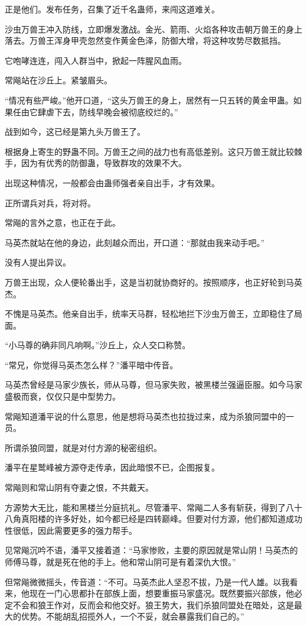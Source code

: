 \begin{this_body}
正是他们。发布任务，召集了近千名蛊师，来闯这道难关。

沙虫万兽王冲入防线，立即爆发激战。金光、箭雨、火焰各种攻击朝万兽王的身上落去。万兽王浑身甲壳忽然变作黄金色泽，防御大增，将这种攻势尽数抵挡。

它咆哮连连，闯入人群当中，掀起一阵腥风血雨。

常飚站在沙丘上。紧皱眉头。

“情况有些严峻。”他开口道，“这头万兽王的身上，居然有一只五转的黄金甲蛊。如果任由它肆虐下去，防线早晚会被彻底绞烂的。”

战到如今，这已经是第九头万兽王了。

根据身上寄生的野蛊不同。万兽王之间的战力也有高低差别。这只万兽王就比较棘手，因为有优秀的防御蛊，导致群攻的效果不大。

出现这种情况，一般都会由蛊师强者亲自出手，才有效果。

正所谓兵对兵，将对将。

常飚的言外之意，也正在于此。

马英杰就站在他的身边，此刻越众而出，开口道：“那就由我来动手吧。”

没有人提出异议。

万兽王出现，众人便轮番出手，这是当初就协商好的。按照顺序，也正好轮到马英杰。

不愧是马英杰。他亲自出手，统率天马群，轻松地拦下沙虫万兽王，立即稳住了局面。

“小马尊的确非同凡响啊。”沙丘上，众人交口称赞。

“常兄，你觉得马英杰怎么样？”潘平暗中传音。

马英杰曾经是马家少族长，师从马尊，但马家失败，被黑楼兰强逼臣服。如今马家盛极而衰，仅仅只是中型势力。

常飚知道潘平说的什么意思，他是想将马英杰也拉拢过来，成为杀狼同盟中的一员。

所谓杀狼同盟，就是对付方源的秘密组织。

潘平在星鹫峰被方源夺走传承，因此暗恨不已，企图报复。

常飚则和常山阴有夺妻之恨，不共戴天。

方源势大无比，能和黑楼兰分庭抗礼。尽管潘平、常飚二人多有斩获，得到了八十八角真阳楼的许多好处，如今都已经是四转巅峰。但要对付方源，他们都知道成功性很低，因此需要更多的强力帮手。

见常飚沉吟不语，潘平又接着道：“马家惨败，主要的原因就是常山阴！马英杰的师傅马尊，就是死在他的手上。他和常山阴可是有着深仇大恨。”

但常飚微微摇头，传音道：“不可。马英杰此人坚忍不拔，乃是一代人雄。以我看来，他现在一门心思都扑在部族上面，想要重振马家盛况。既然要振兴部族，他必定不会和狼王作对，反而会和他交好。狼王势大，我们杀狼同盟处在暗处，这是最大的优势。不能胡乱招揽外人，一个不妥，就会暴露我们自己的。”


\end{this_body}
